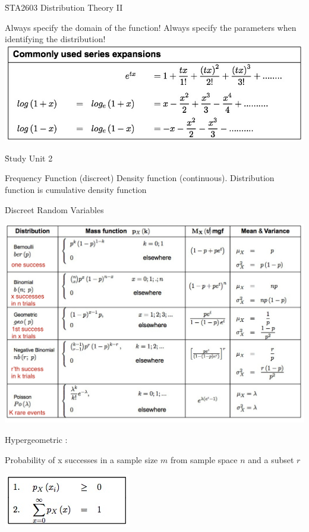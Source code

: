 \documentclass{/out/app/latex/examnotes}
\begin{document}
\obeylines

\h{STA2603 Distribution Theory II}

\ra Always specify the domain of the function!
\ra Always specify the parameters when identifying the distribution!
\vspace{6pt}
\includegraphics[scale=0.5]{./img/expan.jpg}

\h{Study Unit 2}

\ra Frequency Function (discreet)
\ra Density function (continuous).
\ra Distribution function is cumulative density function

\h{Discreet Random Variables}

\includegraphics[scale=0.5]{./img/disscreet.jpg}

\disobeylines
Hypergeometric :
\obeylines

Probability of x successes in a sample size $m$ from sample space $n$ and a subset $r$  

\includegraphics[scale=0.8]{./img/2dis.jpg}
\end{document}
